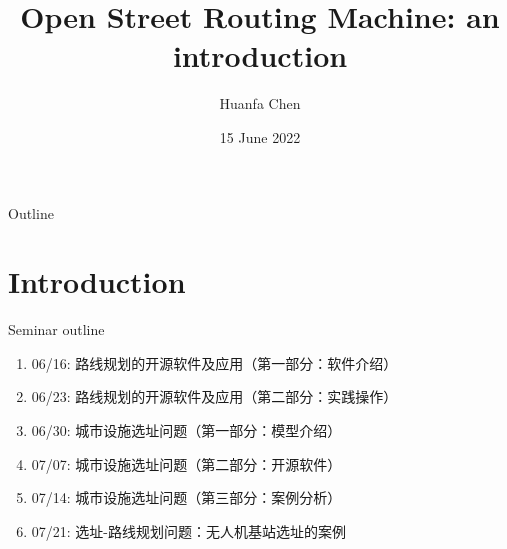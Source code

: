 \documentclass{beamer}
\title[OSRM]{Open Street Routing Machine: an introduction}
\author[Chen]{Huanfa Chen \inst{1} }
\institute[CASA]{\inst{1} Centre for Advanced Spatial Analysis, UCL \and %
                      }
\date{15 June 2022}
\begin{document}
\begin{frame}
  \titlepage%
\end{frame}

\begin{frame}{Outline}
    \tableofcontents[hideallsubsections]
\end{frame}


\section{Introduction}
\begin{frame}{Seminar outline}
\begin{enumerate}
\item 06/16: 路线规划的开源软件及应用（第一部分：软件介绍）
\item 06/23: 路线规划的开源软件及应用（第二部分：实践操作）
\item 06/30: 城市设施选址问题（第一部分：模型介绍）
\item 07/07: 城市设施选址问题（第二部分：开源软件）
\item 07/14: 城市设施选址问题（第三部分：案例分析）
\item 07/21: 选址-路线规划问题：无人机基站选址的案例
\end{enumerate}
\end{frame}


\end{document}
